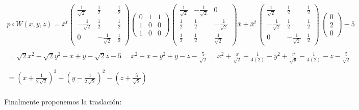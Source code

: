 \documentclass[11pt,letterpaper]{article}
\begin{document}
    \begin{align*}
        p\circ W(x,y,z)=\overline{x}^t \begin{pmatrix}
                \frac{1}{\sqrt{2}} & \frac{1}{2} & \frac{1}{2}\\
                -\frac{1}{\sqrt{2}} & \frac{1}{2}& \frac{1}{2}\\
                 0& -\frac{1}{\sqrt{2}} &\frac{1}{2}
                \end{pmatrix}
                \begin{pmatrix}
                0 & 1 & 1\\
                1 & 0 & 0\\
                1 & 0 & 0
                \end{pmatrix}
                \begin{pmatrix}
                \frac{1}{\sqrt{2}} & -\frac{1}{\sqrt{2}} & 0\\
                \frac{1}{2} & \frac{1}{2}& -\frac{1}{\sqrt{2}}\\
                 \frac{1}{2} & \frac{1}{2} &\frac{1}{\sqrt{2}}
                \end{pmatrix}\overline{x}+\overline{x}^t\,\begin{pmatrix}
                \frac{1}{\sqrt{2}} & \frac{1}{2} & \frac{1}{2}\\
                -\frac{1}{\sqrt{2}} & \frac{1}{2}& \frac{1}{2}\\
                 0& -\frac{1}{\sqrt{2}} &\frac{1}{2}
                \end{pmatrix}\,
                \begin{pmatrix}
                0 \\
                2\\
                0
                \end{pmatrix}-5\,\\
                \,\\
                =\sqrt{2}x^2-\sqrt{2}y^2+x+y-\sqrt{2}z-5
                =x^2+x-y^2+y-z-\frac{5}{\sqrt{2}}=x^2+\frac{x}{\sqrt{2}}+\frac{1}{4(2)}-y^2+\frac{y}{\sqrt{y}}-\frac{1}{4(2)}-z-\frac{5}{\sqrt{2}}\,\\
                \,\\
                =\left(x+\frac{1}{2\,\sqrt{2}}\right)^2-\left(y-\frac{1}{2\,\sqrt{2}}\right)^2-\left(z+\frac{5}{\sqrt{2}}\right)
    \end{align*}\,\\
    \newpage
    Finalmente proponemos la traslaci\'on:\,\\
\end{document}
